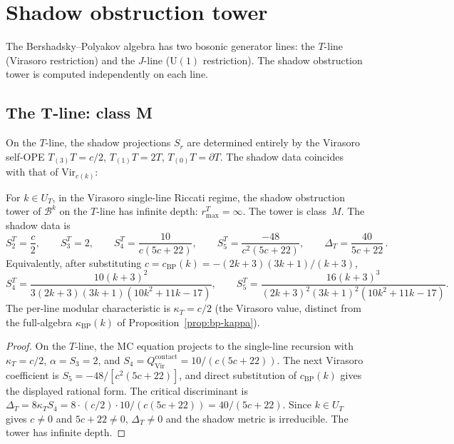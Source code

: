 \section{Shadow obstruction tower}\label{sec:bp-shadow}

The Bershadsky--Polyakov algebra has two bosonic generator lines:
the $T$-line (Virasoro restriction) and the $J$-line ($\mathrm{U}(1)$
restriction). The shadow obstruction tower is computed independently
on each line.

\subsection{The T-line: class M}

On the $T$-line, the shadow projections $S_r$ are determined
entirely by the Virasoro self-OPE $T_{(3)}T = c/2$, $T_{(1)}T = 2T$,
$T_{(0)}T = \partial T$. The shadow data coincides with that of
$\mathrm{Vir}_{c(k)}$:

\begin{proposition}
\label{prop:bp-tline-depth}
For $k\in U_T$, in the Virasoro single-line Riccati regime, the
shadow obstruction tower of $\mathcal{B}^k$
on the $T$-line has infinite depth:
$r_{\max}^T = \infty$. The tower is class~$M$. The shadow data is
\begin{equation}\label{eq:bp-tline-shadows}
S_2^T = \frac{c}{2}, \qquad
S_3^T = 2, \qquad
S_4^T = \frac{10}{c(5c+22)}, \qquad
S_5^T = \frac{-48}{c^2(5c+22)}, \qquad
\Delta_T = \frac{40}{5c+22}\,.
\end{equation}
Equivalently, after substituting
$c=c_{\mathrm{BP}}(k)=-(2k+3)(3k+1)/(k+3)$,
\[
S_4^T
=\frac{10(k+3)^2}
{3(2k+3)(3k+1)(10k^2+11k-17)},\qquad
S_5^T
=\frac{16(k+3)^3}
{(2k+3)^2(3k+1)^2(10k^2+11k-17)}.
\]
The per-line modular characteristic is $\kappa_T = c/2$
\textup{(}the Virasoro value, distinct from the full-algebra
$\kappa_{\mathrm{BP}}(k)$ of Proposition~\ref{prop:bp-kappa}\textup{)}.
\end{proposition}

\begin{proof}
On the $T$-line, the MC equation projects to the single-line
recursion with $\kappa_T = c/2$, $\alpha = S_3 = 2$, and
$S_4 = Q^{\mathrm{contact}}_{\mathrm{Vir}} = 10/(c(5c+22))$.
The next Virasoro coefficient is $S_5=-48/[c^2(5c+22)]$, and direct
substitution of $c_{\mathrm{BP}}(k)$ gives the displayed rational form.
The critical discriminant is $\Delta_T = 8 \kappa_T S_4 =
8 \cdot (c/2) \cdot 10/(c(5c+22)) = 40/(5c+22)$. Since
$k\in U_T$ gives $c\ne0$ and $5c + 22 \neq 0$,
$\Delta_T \neq 0$ and the shadow metric is irreducible.
The tower has infinite depth.
\end{proof}

